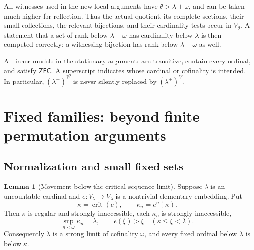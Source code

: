\documentclass[11pt,letterpaper]{article}
\theoremstyle{definition}
\newtheorem{lemma}[definition]{Lemma}
\numberwithin{equation}{section}
\newcommand{\ZFC}{\mathsf{ZFC}}
\newcommand{\crit}{\operatorname{crit}}
\begin{document}
All witnesses used in the new local arguments have $\theta>\lambda+\omega$, and can be taken much higher for reflection. Thus the actual quotient, its complete sections, their small collections, the relevant bijections, and their cardinality tests occur in $V_\theta$. A statement that a set of rank below $\lambda+\omega$ has cardinality below $\lambda$ is then computed correctly: a witnessing bijection has rank below $\lambda+\omega$ as well.

All inner models in the stationary arguments are transitive, contain every ordinal, and satisfy $\ZFC$. A superscript indicates whose cardinal or cofinality is intended. In particular, $(\lambda^+)^W$ is never silently replaced by $(\lambda^+)^V$.

\section{Fixed families: beyond finite permutation arguments}\label{sec:fixed}

\subsection{Normalization and small fixed sets}

\begin{lemma}[Movement below the critical-sequence limit]\label{lem:normal}
Suppose $\lambda$ is an uncountable cardinal and $e:V_\lambda\to V_\lambda$ is a nontrivial elementary embedding. Put
\[
\kappa=\crit(e),\qquad \kappa_n=e^n(\kappa).
\]
Then $\kappa$ is regular and strongly inaccessible, each $\kappa_n$ is strongly inaccessible,
\[
\sup_{n<\omega}\kappa_n=\lambda,
\qquad e(\xi)>\xi\quad(\kappa\le\xi<\lambda).
\]
Consequently $\lambda$ is a strong limit of cofinality $\omega$, and every fixed ordinal below $\lambda$ is below $\kappa$.
\end{lemma}
\end{document}
